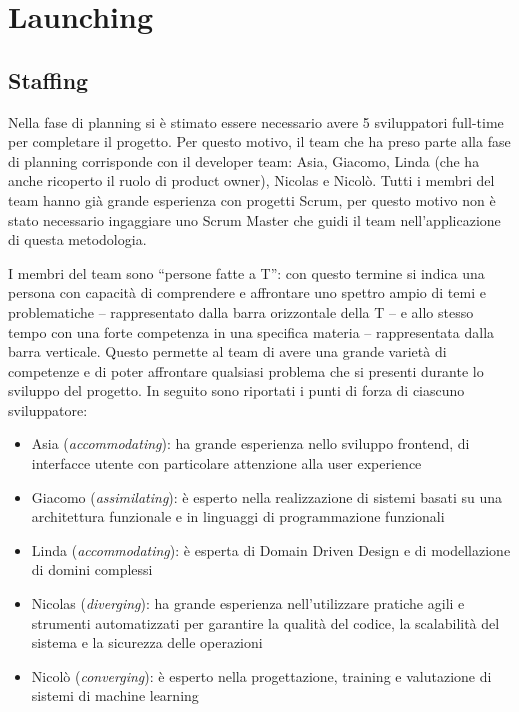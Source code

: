 \chapter{Launching}\label{ch:launching}

\section{Staffing}\label{sec:staffing}

Nella fase di planning si è stimato essere necessario avere 5 sviluppatori full-time per completare il progetto. Per questo motivo, il team che ha preso parte alla fase di planning corrisponde con il developer team: Asia, Giacomo, Linda (che ha anche ricoperto il ruolo di product owner), Nicolas e Nicolò.
Tutti i membri del team hanno già grande esperienza con progetti Scrum, per questo motivo non è stato necessario ingaggiare uno Scrum Master che guidi il team nell'applicazione di questa metodologia.

I membri del team sono ``persone fatte a T'': con questo termine si indica una persona con capacità di comprendere e affrontare uno spettro ampio di temi e problematiche -- rappresentato dalla barra orizzontale della T -- e allo stesso tempo con una forte competenza in una specifica materia -- rappresentata dalla barra verticale. Questo permette al team di avere una grande varietà di competenze e di poter affrontare qualsiasi problema che si presenti durante lo sviluppo del progetto. In seguito sono riportati i punti di forza di ciascuno sviluppatore:
\begin{itemize}
  \item Asia (\emph{accommodating}): ha grande esperienza nello sviluppo frontend, di interfacce utente con particolare attenzione alla user experience
  \item Giacomo (\emph{assimilating}): è esperto nella realizzazione di sistemi basati su una architettura funzionale e in linguaggi di programmazione funzionali 
  \item Linda (\emph{accommodating}): è esperta di Domain Driven Design e di modellazione di domini complessi
  \item Nicolas (\emph{diverging}): ha grande esperienza nell'utilizzare pratiche agili e strumenti automatizzati per garantire la qualità del codice, la scalabilità del sistema e la sicurezza delle operazioni
  \item Nicolò (\emph{converging}): è esperto nella progettazione, training e valutazione di sistemi di machine learning
\end{itemize}

